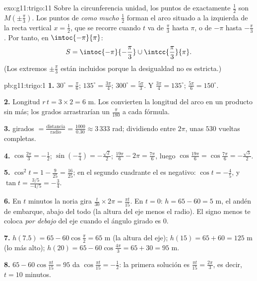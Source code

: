 \begin{solution}{exo:g11:trigo:11}
Sobre la circunferencia unidad, los puntos de  exactamente
$\frac12$ son $M\!\left(\pm\frac\pi3\right)$. Los puntos de 
\emph{como mucho} $\frac12$ forman el arco situado a la izquierda de la
recta vertical $x = \frac12$, que se recorre cuando $t$ va de $\frac\pi3$
hasta $\pi$, o de $-\pi$ hasta $-\frac\pi3$. Por tanto, en
$\intoc{-\pi}{\pi}$:
\[
S = \intoc{-\pi}{-\frac{\pi}{3}} \cup \intcc{\frac{\pi}{3}}{\pi}.
\]
(Los extremos $\pm\frac\pi3$ están incluidos porque la desigualdad no es
estricta.)
\end{solution}

\begin{solution}{pb:g11:trigo:1}
\textbf{1.} $30^\circ = \frac{\pi}{6}$; $135^\circ = \frac{3\pi}{4}$;
$300^\circ = \frac{5\pi}{3}$. Y $\frac{3\pi}{4} = 135^\circ$;
$\frac{5\pi}{6} = 150^\circ$.

\textbf{2.} Longitud $r\,t = 3 \times 2 = 6$ m. Los  convierten la
longitud del arco en un producto sin más; los grados arrastrarían un
$\frac{\pi}{180}$ a cada fórmula.

\textbf{3.}  girados $= \frac{\text{distancia}}{\text{radio}} =
\frac{1000}{0.30} \approx 3\,333$ rad; dividiendo entre $2\pi$, unas $530$
vueltas completas.

\textbf{4.} $\cos\frac{2\pi}{3} = -\frac12$;
$\sin\left(-\frac\pi4\right) = -\frac{\sqrt2}{2}$;
$\frac{19\pi}{6} - 2\pi = \frac{7\pi}{6}$, luego
$\cos\frac{19\pi}{6} = \cos\frac{7\pi}{6} = -\frac{\sqrt3}{2}$.

\textbf{5.} $\cos^2 t = 1 - \frac{9}{25} = \frac{16}{25}$; en el segundo
cuadrante el  es negativo: $\cos t = -\frac45$, y
$\tan t = \frac{3/5}{-4/5} = -\frac34$.

\textbf{6.} En $t$ minutos la noria gira
$\frac{t}{30} \times 2\pi = \frac{\pi t}{15}$. En $t = 0$:
$h = 65 - 60 = 5$ m, el andén de embarque, abajo del todo (la altura del
eje menos el radio). El signo menos te coloca \emph{por debajo} del eje
cuando el ángulo girado es $0$.

\textbf{7.} $h(7.5) = 65 - 60\cos\frac{\pi}{2} = 65$ m (la altura del
eje); $h(15) = 65 + 60 = 125$ m (lo más alto);
$h(20) = 65 - 60\cos\frac{4\pi}{3} = 65 + 30 = 95$ m.

\textbf{8.} $65 - 60\cos\frac{\pi t}{15} = 95$ da
$\cos\frac{\pi t}{15} = -\frac12$: la primera solución es
$\frac{\pi t}{15} = \frac{2\pi}{3}$, es decir, $t = 10$ minutos.


\end{solution}
